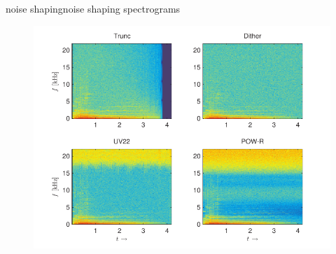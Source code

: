 	\begin{frame}{noise shaping}{noise shaping spectrograms}
        \vspace{-4mm}
		\begin{figure}
			\centering
				\includegraphics[scale=0.8]{Graph/noiseshaping_spectrum}
		\end{figure}
	\end{frame}
	
